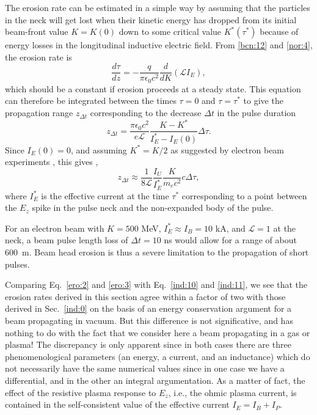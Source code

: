 \documentclass [12pt,a4paper,     ]{report} %
\begin{document}
	The erosion rate can be estimated in a simple way by assuming that the particles in the neck will get lost when their kinetic energy has dropped from its initial beam-front value $K=K(0)$ down to some critical value $K^*(\tau^*)$ because of energy losses in the longitudinal inductive electric field.  From \eqref{bcn:12} and \eqref{nor:4}, the erosion rate is 
%
\begin{equation}\label{ero:1} %
   \frac{d\tau}{dz} = -\frac{q}{\pi\epsilon_0c^2}
                       \frac{d}{dK} (\mathcal{L}I_E),
\end{equation}
%
which should be a constant if erosion proceeds at a steady state.  This equation can therefore be integrated between the times $\tau =0$ and $\tau =\tau^*$ to give the propagation range $z_{\Delta t}$ corresponding to the decrease $\Delta t$ in the pulse duration \cite{LEE--1980A}
%
\begin{equation}\label{ero:2} %
   z_{\Delta t} = \frac{\pi\epsilon_0c^2}{e\mathcal{L}}
                  \frac{K-K^*}{I_E^*-I_E(0)} \Delta \tau.
\end{equation}
%
Since $I_E(0) = 0$, and assuming $K^* = K/2$ as suggested by electron beam experiments \cite{LEE--1980A}, this gives  \cite{LEE--1980A,SHARP1980-}, 
%
\begin{equation}\label{ero:3} %
   z_{\Delta t} \approx \frac{1}{8\mathcal{L}}
                        \frac{I_U}{I_E^*}
                        \frac{K}{m_ec^2} c\Delta \tau,
\end{equation}
%
where $I_E^*$ is the effective current at the time $\tau^*$ corresponding to a point between the $E_z$ spike in the pulse neck and the non-expanded body of the pulse.

   For an electron beam with $K = 500$ MeV, $I_E^* \approx I_B = 10$ kA, and $\mathcal{L} = 1$ at the neck, a beam pulse length loss of $\Delta t = 10$ ns would allow for a range of about 600~m.  Beam head erosion is thus a severe limitation to the propagation of short pulses. 

    Comparing Eq.~\eqref{ero:2} and \eqref{ero:3} with Eq.~\eqref{ind:10} and  \eqref{ind:11}, we see that the erosion rates derived in this section agree within a factor of two with those derived in Sec.~\ref{ind:0} on the basis of an energy conservation argument for a beam propagating in vacuum.  But this difference is not significative, and has nothing to do with the fact that we consider here a beam propagating in a gas or plasma!  The discrepancy is only apparent since in both cases there are three phenomenological parameters (an energy, a current, and an inductance) which do not necessarily have the same numerical values since in one case we have a differential, and in the other an integral argumentation.  As a matter of fact, the effect of the resistive plasma response to $E_z$, i.e., the ohmic plasma current, is contained in the self-consistent value of the effective current $I_E=I_B+I_P$. 
\end{document}
